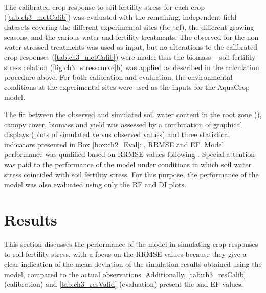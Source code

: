The calibrated crop response to soil fertility stress for each crop (\autoref{tab:ch3_metCalib}) was evaluated with the remaining, independent field datasets covering the different experimental sites (for tef), the different growing seasons, and the various water and fertility treatments. The observed \Brel for the non water-stressed treatments was used as input, but no alterations to the calibrated crop responses (\autoref{tab:ch3_metCalib}) were made; thus the biomass – soil fertility stress relation (\autoref{fig:ch3_stresscurve}b) was applied as described in the calculation procedure above. For both calibration and evaluation, the environmental conditions at the experimental sites were used as the inputs for the AquaCrop model.
 
The fit between the observed and simulated soil water content in the root zone (\SWCr), canopy cover, biomass and yield was assessed by a combination of graphical displays (plots of simulated versus observed values) and three statistical indicators presented in Box \ref{box:ch2_Eval}: \Rsq, RRMSE and EF. Model performance was qualified based on RRMSE values following \textcite{jamieson1991}. Special attention was paid to the performance of the model under conditions in which soil water stress coincided with soil fertility stress. For this purpose, the performance of the model was also evaluated using only the RF and DI plots.  

\section{Results}
This section discusses the performance of the model in simulating crop responses to soil fertility stress, with a focus on the RRMSE values because they give a clear indication of the mean deviation of the simulation results obtained using the model, compared to the actual observations. Additionally, \autoref{tab:ch3_resCalib} (calibration) and \autoref{tab:ch3_resValid} (evaluation) present the \Rsq and EF values.


